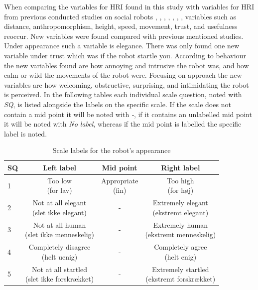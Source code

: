 %
When comparing the variables for HRI found in this study with variables for HRI from previous conducted studies on social robots \cite{PDF:ExploringInfluencingVariable}, \cite{PDF:SharingALifeHarvey}, \cite{PDF:InTheCompanyofRobots}, \cite{PDF:CloseButNotStuck}, \cite{PDF:TheImpactOfTraveler}, \cite{PDF:HumanRobotEmodiedInteraction}, \cite{PDF:RecommendationEffects}, variables such as distance, anthropomorphism, height, speed, movement, trust, and usefulness reoccur. New variables were found compared with previous mentioned studies. Under appearance such a variable is elegance. There was only found one new variable under trust which was if the robot startle you. According to behaviour the new variables found are how annoying and intrusive the robot was, and how calm or wild the movements of the robot were. Focusing on approach the new variables are how welcoming, obstructive, surprising, and intimidating the robot is perceived. In the following tables each individual scale question, noted with \textit{SQ}, is listed alongside the labels on the specific scale. If the scale does not contain a mid point it will be noted with \textit{-}, if it contains an unlabelled mid point it will be noted with \textit{No label}, whereas if the mid point is labelled the specific label is noted. 
%
\begin{table}[H]
	\centering
\caption{Scale labels for the robot's appearance}
	\label{tab:AppearanceScale} 
	\begin{tabular}{l|c|c|c}
		SQ     & Left label & Mid point & Right label \\\hline
		1   & \makecell{Too low \\(for lav)}  & \makecell{Appropriate \\(fin)} & \makecell{Too high \\(for høj)}        \\\hline
		2   & \makecell{Not at all elegant \\(slet ikke elegant)} & - & \makecell{Extremely elegant \\(ekstremt elegant)}         \\\hline
		3   & \makecell{Not at all human \\(slet ikke menneskelig)} & - & \makecell{Extremely human \\(ekstremt menneskelig)}         \\\hline
	 	4   & \makecell{Completely disagree \\(helt uenig)} & - & \makecell{Completely agree \\(helt enig)}         \\\hline
		5   & \makecell{Not at all startled \\(slet ikke forskrækket)} & -  & \makecell{Extremely startled \\(ekstremt forskrækket)}           
	\end{tabular}        
\end{table}

